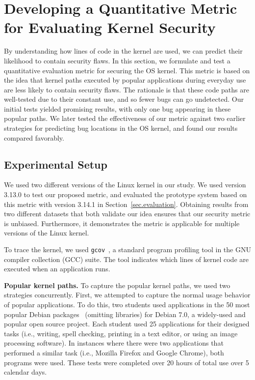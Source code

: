 \section{Developing a Quantitative Metric for Evaluating Kernel Security}
\label{sec.metric}

By understanding how lines of code in the kernel are used, we can predict their
likelihood to contain security flaws. In this section, we formulate and test
a quantitative evaluation metric for securing the OS kernel.
This metric is based on the idea that kernel paths executed by popular applications
during everyday use are less likely to contain security flaws.
The rationale is that these code paths are well-tested due to their constant use, and so
fewer bugs can go undetected. Our initial tests yielded promising results, with only one
bug appearing in these popular paths.  We later tested the effectiveness
of our metric against two earlier strategies for predicting bug
locations in the OS kernel, and found our results compared favorably.

\subsection{Experimental Setup}\label{sec-setup}
We used two different versions of
the Linux kernel in our study.
We used version 3.13.0 to test our proposed metric, and evaluated the prototype system based on this
 metric with version 3.14.1 in
Section~\ref{sec.evaluation}. Obtaining results from two different datasets that both validate
our idea ensures that our security metric is unbiased. Furthermore,
it demonstrates the metric is applicable
for multiple versions of the Linux kernel.

To trace the kernel, we used \texttt{gcov}~\cite{gcov}, a standard program profiling
tool in the GNU compiler collection (GCC) suite. The tool indicates which lines of kernel
code are executed when an application runs.

\textbf{Popular kernel paths.}
To capture the popular kernel paths, we used two strategies concurrently.
First, we attempted to capture the normal usage behavior of popular applications.
To do this, two students used applications in the 50 most popular Debian
packages~\cite{Top-Packages} (omitting libraries) for Debian 7.0, a widely-used and
popular open source project.
Each student used 25 applications for their designed
tasks (i.e., writing, spell checking, printing in a text editor, or using
an image processing software). In instances where there were two applications that performed a
similar task (i.e., Mozilla Firefox and Google Chrome), both programs were
used. These tests were completed over 20 hours of
total use over 5 calendar days.

